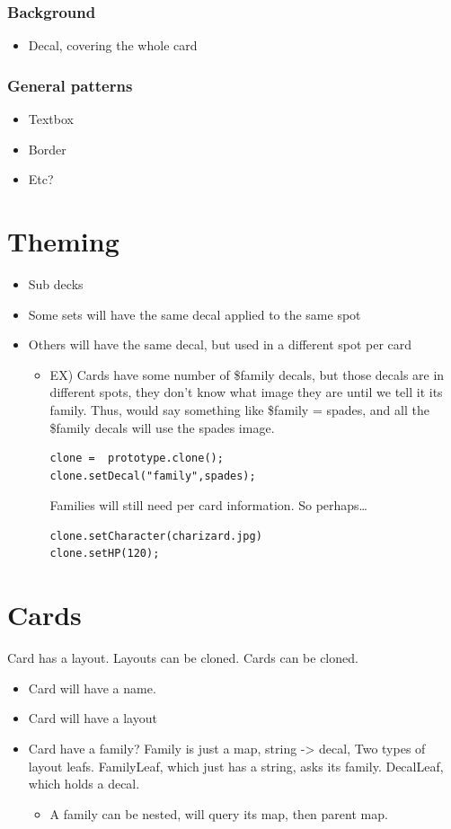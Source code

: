 \documentclass[11pt]{article}
\begin{document}
\subsubsection{Background}
\label{sec-2-3-1}
\begin{itemize}
\item Decal, covering the whole card
\end{itemize}

\subsubsection{General patterns}
\label{sec-2-3-2}
\begin{itemize}
\item Textbox
\item Border
\item Etc?
\end{itemize}
\section{Theming}
\label{sec-3}
\begin{itemize}
\item Sub decks
\item Some sets will have the same decal applied to the same spot
\item Others will have the same decal, but used in a different spot per card
\begin{itemize}
\item EX) Cards have some number of \$family decals, but those decals are in different spots, they don't know what image they are until we tell it its family. Thus, would say something like \$family = spades, and all the \$family decals will use the spades image.

\begin{verbatim}
clone =  prototype.clone();
clone.setDecal("family",spades);
\end{verbatim}
Families will still need per card information.
So perhaps\ldots{}
\begin{verbatim}
clone.setCharacter(charizard.jpg)
clone.setHP(120);
\end{verbatim}
\end{itemize}
\end{itemize}

\section{Cards}
\label{sec-4}
Card has a layout. Layouts can be cloned. 
Cards can be cloned.
\begin{itemize}
\item Card will have a name.
\item Card will have a layout
\item Card have a family? Family is just a map, string -> decal, Two types of layout leafs. FamilyLeaf, which just has a string, asks its family. DecalLeaf, which holds a decal.
\begin{itemize}
\item A family can be nested, will query its map, then parent map.
\end{itemize}
\end{itemize}
\end{document}
